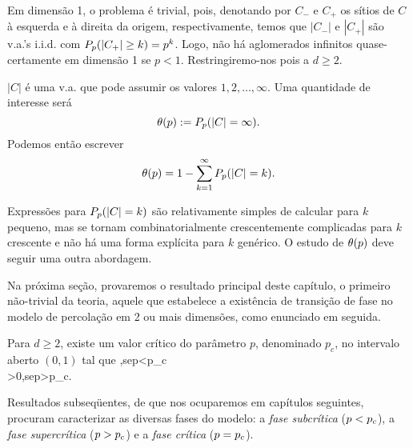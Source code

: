 Em dimensão 1, o problema é trivial, pois, denotando por
$C_-$ e $C_+$ os sítios de $C$ à esquerda e à direita da origem, respectivamente,
temos que $|C_-|$ e $|C_+|$ são v.a.'s i.i.d. com $P_p(|C_+|\geq k)=p^k$. Logo, não há
aglomerados infinitos quase-certamente em dimensão 1 se $p<1$.
Restringiremo-nos pois a $d\geq2$.

$|C|$ é uma v.a. que pode assumir os valores $1,2,\ldots,\infty$.
Uma quantidade de interesse será $$\theta(p):=P_p(|C|=\infty).$$
Podemos então escrever $$\theta(p)=1-\sum_{k=1}^{\infty}P_p(|C|=k).$$

Expressões para $P_p(|C|=k)$ são relativamente simples de calcular para
$k$ pequeno, mas se tornam combinatorialmente crescentemente complicadas 
para $k$ crescente
e não há uma forma explícita para $k$ genérico. O estudo de $\theta(p)$ deve
seguir uma outra abordagem.

Na próxima seção, provaremos o resultado principal deste capítulo, o 
primeiro não-trivial da teoria, aquele que estabelece a existência de
transição de fase no modelo de percolação em 2 ou mais dimensões, como 
enunciado em seguida.


\vs


\bteo
\label{teo:trans}
Para $d\geq2$, existe um valor crítico do parâmetro $p$, denomi\-nado $p_c$,
no intervalo aberto $(0,1)$ tal que 
\beqnn
{},\quad \mbox{se}\quad p<p_c\\
\tep>0,\quad \mbox{se}\quad p>p_c.
\eeqnn
\eteo

\vs


Resultados subseqüentes, de que nos ocuparemos em capítulos seguintes,
procuram caracterizar as diversas fases do modelo: a {\em fase subcrítica}
($p<p_c$), a {\em fase supercrítica} ($p>p_c$) e a {\em fase crítica} ($p=p_c$).

\vs
